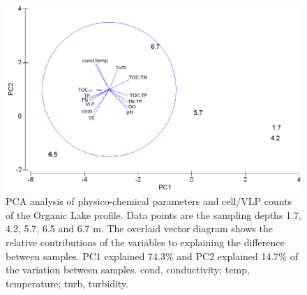 \begin{figure}
\includegraphics[width=\textwidth]{orglake_figures/pca.pdf}
\caption[PCA analysis of physico-chemical parameters]{PCA analysis of physico-chemical parameters and cell/\ac{VLP} counts of the Organic Lake profile. Data points are the sampling depths 1.7, 4.2, 5.7, 6.5 and 6.7 m. The overlaid vector diagram shows the relative contributions of the variables to explaining the difference between samples. PC1 explained 74.3\% and PC2 explained 14.7\% of the variation between samples. cond, conductivity; temp, temperature; turb, turbidity.}
\label{fig:pca}

\end{figure}

